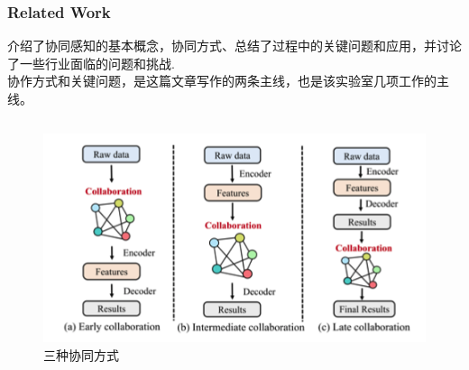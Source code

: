 \documentclass[8]{beamer}
\begin{document}
\begin{frame}
    \frametitle{Related Work}
    \setbeamerfont{}{}
    \scriptsize
    \cite{ren2023collaborative}介绍了协同感知的基本概念，协同方式、总结了过程中的关键问题和应用，并讨论了一些行业面临的问题和挑战.\\
    协作方式和关键问题，是这篇文章写作的两条主线，也是该实验室几项工作的主线。
    \bigskip
    \begin{columns}[t]
        \begin{column}{0.5\linewidth}
            \begin{figure}
                \includegraphics[width=\linewidth]{pic/Collaborative_mode.png}
                \caption[cooper_mode]{三种协同方式}
                \label{cooper_mode}
            \end{figure}
        \end{column}


\end{columns}
\end{frame}
\end{document}
